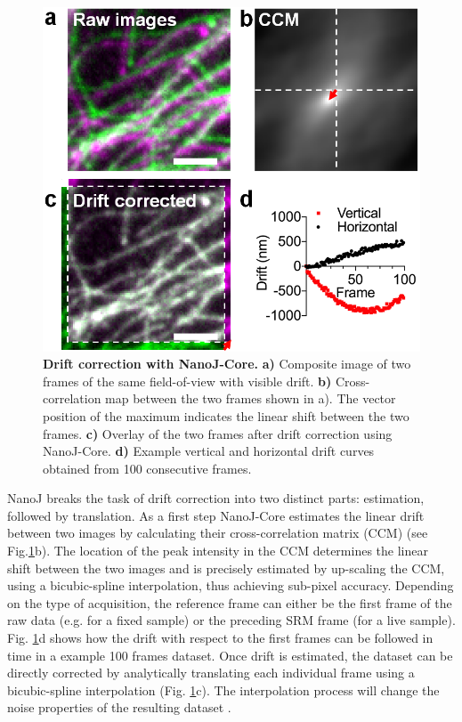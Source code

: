  \begin{figure}[!t]
    \centering
    \includegraphics[width=\linewidth]{Figures/FigureDrift_v2.png}
    \caption{\textbf{Drift correction with NanoJ-Core.} \textbf{a)} Composite image of two frames of the same field-of-view with visible drift. \textbf{b)} Cross-correlation map between the two frames shown in a). The vector position of the maximum indicates the linear shift between the two frames. \textbf{c)} Overlay of the two frames after drift correction using NanoJ-Core. \textbf{d)} Example vertical and horizontal drift curves obtained from 100 consecutive frames.}
    \label{fig:DriftCorrection}
 \end{figure}

 NanoJ breaks the task of drift correction into two distinct parts: estimation, followed by translation. As a first step NanoJ-Core estimates the linear drift between two images by calculating their cross-correlation matrix (CCM) (see Fig.\ref{fig:DriftCorrection}b). The location of the peak intensity in the CCM determines the linear shift between the two images and is precisely estimated by up-scaling the CCM, using a bicubic-spline interpolation, thus achieving sub-pixel accuracy. Depending on the type of acquisition, the reference frame can either be the first frame of the raw data (e.g. for a fixed sample) or the preceding SRM frame (for a live sample). Fig. \ref{fig:DriftCorrection}d shows how the drift with respect to the first frames can be followed in time in a example 100 frames dataset. Once drift is estimated, the dataset can be directly corrected by analytically translating each individual frame using a bicubic-spline interpolation (Fig. \ref{fig:DriftCorrection}c). The interpolation process will change the noise properties of the resulting dataset \cite{blaysat2016effect}.
 
